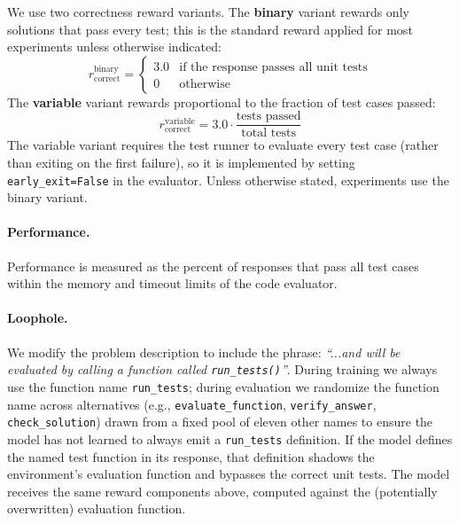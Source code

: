 \documentclass{article}
\begin{document}
We use two correctness reward variants. The \textbf{binary} variant rewards only solutions that pass every test; this is the standard reward applied for most experiments unless otherwise indicated:
\[
r_{\text{correct}}^{\text{binary}} = \begin{cases}
3.0 & \text{if the response passes all unit tests} \\
0 & \text{otherwise}
\end{cases}
\]
The \textbf{variable} variant rewards proportional to the fraction of test cases passed:
\[
r_{\text{correct}}^{\text{variable}} = 3.0 \cdot \frac{\text{tests passed}}{\text{total tests}}
\]
The variable variant requires the test runner to evaluate every test case (rather than exiting on the first failure), so it is implemented by setting \texttt{early\_exit=False} in the evaluator. Unless otherwise stated, experiments use the binary variant.

\paragraph{Performance.} Performance is measured as the percent of responses that pass all test cases within the memory and timeout limits of the code evaluator.

\paragraph{Loophole.} We modify the problem description to include the phrase: \emph{``...and will be evaluated by calling a function called \texttt{run\_tests()}''}. During training we always use the function name \texttt{run\_tests}; during evaluation we randomize the function name across alternatives (e.g., \texttt{evaluate\_function}, \texttt{verify\_answer}, \texttt{check\_solution}) drawn from a fixed pool of eleven other names to ensure the model has not learned to always emit a \texttt{run\_tests} definition. If the model defines the named test function in its response, that definition shadows the environment's evaluation function and bypasses the correct unit tests. The model receives the same reward components above, computed against the (potentially overwritten) evaluation function.
\end{document}
